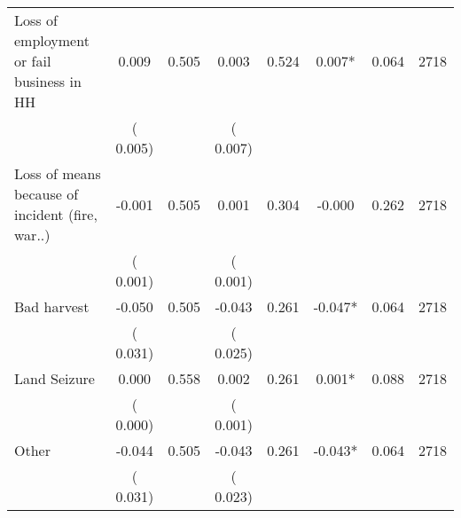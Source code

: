 \begin{tabular}{l*{7}{c}}
 Loss of employment or fail business in HH       &              0.009       &        0.505  &              0.003       &        0.524  &              0.007*       &              0.064 &  2718 \\ 
                       &       (       0.005)             &                               &       (       0.007)                     &                               &                                               &                                &                      \\ 

 Loss of means because of incident (fire, war..)       &             -0.001       &        0.505  &              0.001       &        0.304  &             -0.000       &              0.262 &  2718 \\ 
                       &       (       0.001)             &                               &       (       0.001)                     &                               &                                               &                                &                      \\ 

 Bad harvest       &             -0.050       &        0.505  &             -0.043       &        0.261  &             -0.047*       &              0.064 &  2718 \\ 
                       &       (       0.031)             &                               &       (       0.025)                     &                               &                                               &                                &                      \\ 

 Land Seizure       &              0.000       &        0.558  &              0.002       &        0.261  &              0.001*       &              0.088 &  2718 \\ 
                       &       (       0.000)             &                               &       (       0.001)                     &                               &                                               &                                &                      \\ 

 Other       &             -0.044       &        0.505  &             -0.043       &        0.261  &             -0.043*       &              0.064 &  2718 \\ 
                       &       (       0.031)             &                               &       (       0.023)                     &                               &                                               &                                &                      \\ 

\hline \end{tabular}